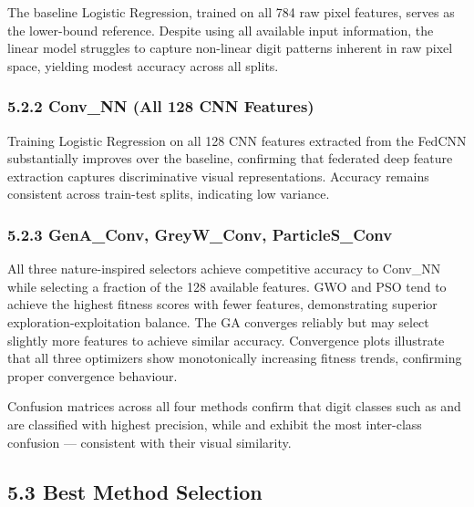 \documentclass[
]{article}
\begin{document}
The baseline Logistic Regression, trained on all 784 raw pixel features,
serves as the lower-bound reference. Despite using all available input
information, the linear model struggles to capture non-linear digit
patterns inherent in raw pixel space, yielding modest accuracy across
all splits.

\hypertarget{conv_nn-all-128-cnn-features}{%
\subsubsection{5.2.2 Conv\_NN (All 128 CNN
Features)}\label{conv_nn-all-128-cnn-features}}

Training Logistic Regression on all 128 CNN features extracted from the
FedCNN substantially improves over the baseline, confirming that
federated deep feature extraction captures discriminative visual
representations. Accuracy remains consistent across train-test splits,
indicating low variance.

\hypertarget{gena_conv-greyw_conv-particles_conv}{%
\subsubsection{5.2.3 GenA\_Conv, GreyW\_Conv,
ParticleS\_Conv}\label{gena_conv-greyw_conv-particles_conv}}

All three nature-inspired selectors achieve competitive accuracy to
Conv\_NN while selecting a fraction of the 128 available features. GWO
and PSO tend to achieve the highest fitness scores with fewer features,
demonstrating superior exploration-exploitation balance. The GA
converges reliably but may select slightly more features to achieve
similar accuracy. Convergence plots illustrate that all three optimizers
show monotonically increasing fitness trends, confirming proper
convergence behaviour.

Confusion matrices across all four methods confirm that digit classes
such as \textquotesingle{} and
\textquotesingle{} are classified with highest
precision, while \textquotesingle{} and
\textquotesingle{} exhibit the most inter-class
confusion --- consistent with their visual similarity.

\hypertarget{best-method-selection}{%
\subsection{5.3 Best Method Selection}\label{best-method-selection}}
\end{document}
